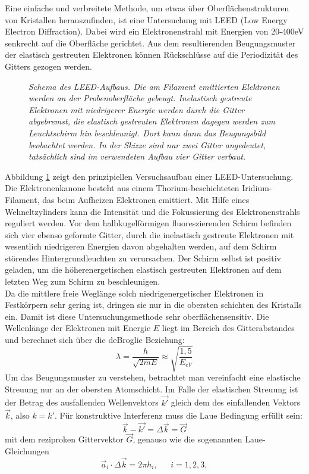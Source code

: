 \FloatBarrier

Eine einfache und verbreitete Methode, um etwas über Oberflächenstrukturen von
 Kristallen herauszufinden, ist eine Untersuchung mit LEED (Low Energy Electron
 Diffraction).
 Dabei wird ein Elektronenstrahl mit Energien von 20-400eV senkrecht auf die
 Oberfläche gerichtet. Aus dem resultierenden
 Beugungsmuster der elastisch gestreuten Elektronen können Rückschlüsse auf die Periodizität des Gitters
 gezogen werden.


 \begin{figure}[H]
	\centering
	\sffamily 
	
	\caption{\textit{Schema des LEED-Aufbaus. Die am Filament emittierten Elektronen werden an der
	Probenoberfläche gebeugt. Inelastisch gestreute Elektronen mit niedrigerer Energie werden durch die
	Gitter abgebremst, die elastisch gestreuten Elektronen dagegen werden zum Leuchtschirm
	hin beschleunigt. Dort kann dann das Beugungsbild beobachtet werden. In der Skizze sind nur zwei
	Gitter angedeutet, tatsächlich sind im verwendeten Aufbau vier Gitter verbaut.}}
	\label{leedaufbau}
\end{figure}




 Abbildung \ref{leedaufbau} zeigt den prinzipiellen Versuchsaufbau einer LEED-Untersuchung. Die
 Elektronenkanone besteht aus einem Thorium-beschichteten Iridium-Filament, das beim Aufheizen
 Elektronen emittiert. Mit Hilfe eines Wehneltzylinders kann die Intensität und die Fokussierung
 des Elektronenstrahls reguliert werden. Vor dem halbkugelförmigen fluoreszierenden Schirm befinden
 sich vier ebenso geformte Gitter, durch die inelastisch gestreute Elektronen mit wesentlich
 niedrigeren Energien davon abgehalten werden, auf dem Schirm störendes Hintergrundleuchten zu
 verursachen. Der Schirm selbst ist positiv geladen, um die höherenergetischen elastisch gestreuten
 Elektronen auf dem letzten Weg zum Schirm zu beschleunigen.\\
  Da die mittlere freie Weglänge solch niedrigenergetischer Elektronen in
 Festkörpern sehr gering ist, dringen sie nur in die obersten schichten des
 Kristalls ein. Damit ist diese Untersuchungsmethode sehr oberflächensensitiv.
 Die Wellenlänge der Elektronen mit Energie $E$ liegt im Bereich des Gitterabstandes und
 berechnet sich über die deBroglie Beziehung:
 \[\lambda=\frac{h}{\sqrt{2mE}}\approx \sqrt{\frac{1{,}5}{E_{eV}}}\]
Um das Beugungsmuster zu verstehen, betrachtet man vereinfacht eine elastische
Streuung nur an der obersten Atomschicht. Im Falle der elastischen Streuung ist
der Betrag des ausfallenden Wellenvektors $\vec{k'}$ gleich dem des
einfallenden Vektors $\vec{k}$, also $k=k'$. Für konstruktive Interferenz
muss die Laue Bedingung erfüllt sein:
\[\vec{k}-\vec{k'}=\Delta \vec{k}=\vec{G}\]
mit dem reziproken Gittervektor $\vec{G}$, genauso wie die sogenannten Laue-Gleichungen
\[\vec{a}_i\cdot \Delta \vec{k}=2\pi h_i,~~~~~~~i=1, 2, 3,\]


